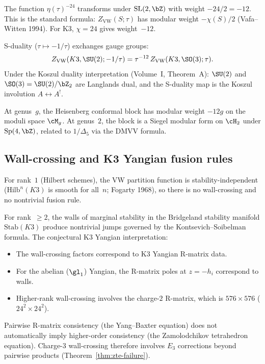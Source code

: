 The function $\eta(\tau)^{-24}$ transforms under $\mathrm{SL}(2, \bZ)$ with weight $-24/2 = -12$. This is the standard formula: $Z_{\mathrm{VW}}(S; \tau)$ has modular weight $-\chi(S)/2$ (Vafa--Witten 1994). For K3, $\chi = 24$ gives weight~$-12$.

S-duality ($\tau \mapsto -1/\tau$) exchanges gauge groups:
\[
 Z_{\mathrm{VW}}(K3, \SU(2); -1/\tau) = \tau^{-12} \, Z_{\mathrm{VW}}(K3, \SO(3); \tau).
\]
Under the Koszul duality interpretation (Volume~I, Theorem~A): $\SU(2)$ and $\SO(3) = \SU(2)/\bZ_2$ are Langlands dual, and the S-duality map is the Koszul involution $A \leftrightarrow A^!$.

At genus~$g$, the Heisenberg conformal block has modular weight $-12g$ on the moduli space $\cM_g$. At genus~$2$, the block is a Siegel modular form on $\cH_2$ under $\mathrm{Sp}(4, \bZ)$, related to $1/\Delta_5$ via the DMVV formula.

\subsection{Wall-crossing and K3 Yangian fusion rules}
\label{subsec:k3e-agt-wall-crossing}

For rank~$1$ (Hilbert schemes), the VW partition function is stability-independent ($\mathrm{Hilb}^n(K3)$ is smooth for all~$n$; Fogarty 1968), so there is no wall-crossing and no nontrivial fusion rule.

For rank~$\geq 2$, the walls of marginal stability in the Bridgeland stability manifold $\mathrm{Stab}(K3)$ produce nontrivial jumps governed by the Kontsevich--Soibelman formula. The conjectural K3 Yangian interpretation:
\begin{itemize}
\item The wall-crossing factors correspond to K3 Yangian R-matrix data.
\item For the abelian ($\gl_1$) Yangian, the R-matrix poles at $z = -h_i$ correspond to walls.
\item Higher-rank wall-crossing involves the charge-$2$ R-matrix, which is $576 \times 576$ ($24^2 \times 24^2$).
\end{itemize}

\begin{remark}
\label{rem:k3e-agt-higher-coherence}
Pairwise R-matrix consistency (the Yang--Baxter equation) does not
automatically imply higher-order consistency (the Zamolodchikov
tetrahedron equation). Charge-$3$ wall-crossing therefore involves
$E_3$ corrections beyond pairwise products
(Theorem~\ref{thm:zte-failure}).
\end{remark}

